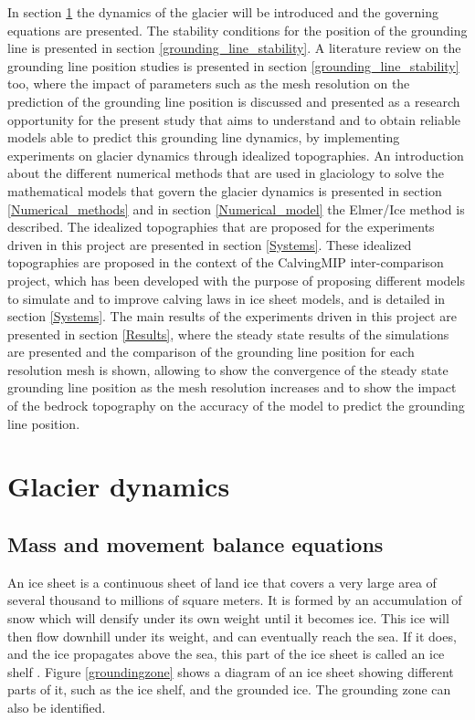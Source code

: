 \documentclass{article}
\begin{document}
In section \ref{glacier_dynamics} the dynamics of the glacier will be introduced and the governing equations are presented. The stability conditions for the position of the grounding line is presented in section \ref{grounding_line_stability}. A literature review on the grounding line position studies is presented in section \ref{grounding_line_stability} too, where the impact of parameters such as the mesh resolution on the prediction of the grounding line position is discussed and presented as a research opportunity for the present study that aims to understand and to obtain reliable models able to predict this grounding line dynamics, by implementing experiments on glacier dynamics through idealized topographies. An introduction about the different numerical methods that are used in glaciology to solve the mathematical models that govern the glacier dynamics is presented in section \ref{Numerical_methods} and in section \ref{Numerical_model} the Elmer/Ice method is described. The idealized topographies that are proposed for the experiments driven in this project are presented in section \ref{Systems}. These idealized topographies are proposed in the context of the CalvingMIP inter-comparison project, which has been developed with the purpose of proposing different models to simulate and to improve calving laws in ice sheet models, and is detailed in section \ref{Systems}. The main results of the experiments driven in this project are presented in section \ref{Results}, where the steady state results of the simulations are presented and the comparison of the grounding line position for each resolution mesh is shown, allowing to show the convergence of the steady state grounding line position as the mesh resolution increases and to show the impact of the bedrock topography on the accuracy of the model to predict the grounding line position. 

\section{Glacier dynamics}
\label{glacier_dynamics}
\subsection{Mass and movement balance equations}
An ice sheet is a continuous sheet of land ice that covers a very large area of several thousand to millions of square meters. It is formed by an accumulation of snow which will densify under its own weight until it becomes ice. This ice will then flow downhill under its weight, and can eventually reach the sea. If it does, and the ice propagates above the sea, this part of the ice sheet is called an ice shelf \cite[]{hutter1982mathematical}. Figure \ref{groundingzone} shows a diagram of an ice sheet showing different parts of it, such as the ice shelf, and the grounded ice. The grounding zone can also be identified. 
\end{document}
